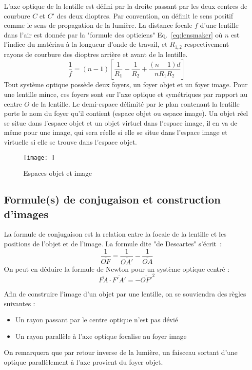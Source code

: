 \documentclass[a4paper]{book}
\begin{document}
L'axe optique de la lentille est défini par la droite passant par les deux centres de courbure $C$ et $C'$ des deux dioptres. Par convention, on définit le sens positif comme le sens de propagation de la lumière.  La distance focale $f$ d'une lentille dans l'air est donnée par la "formule des opticiens" Eq.~\ref{eq:lensmaker} où $n$ est l'indice du matériau à la longueur d'onde de travail, et $R_{1, 2}$ respectivement rayons de courbure des dioptres arrière et avant de la lentille. 
\begin{equation}
\label{eq:lensmaker}
\frac{1}{f}=(n-1)\left[\frac{1}{R_1}-\frac{1}{R_2}+\frac{(n-1)d}{n R_1 R_2}\right]
\end{equation}
Tout système optique possède deux foyers, un foyer objet et un foyer image. Pour une lentille mince, ces foyers sont sur l'axe optique et symétriques par rapport au centre $O$ de la lentille. Le demi-espace délimité par le plan contenant la lentille porte le nom du foyer qu'il contient (espace objet ou espace image). Un objet réel se situe dans l'espace objet et un objet virtuel dans l'espace image, il en va de même pour une image, qui sera réelle si elle se situe dans l'espace image et virtuelle si elle se trouve dans l'espace objet.
\begin{figure}[!htbp]
\begin{center}
\texttt{[image: ]}
\end{center}
\caption{Espaces objet et image}
\label{fig:espaces_lentille_mince}
\end{figure}

\subsection{Formule(s) de conjugaison et construction d'images}

La formule de conjugaison est la relation entre la focale de la lentille et les positions de l'objet et de l'image. La formule dite "de Descartes" s'écrit~:
\begin{equation}
\label{eq:descartes}
\frac{1}{\overline{OF}}=\frac{1}{\overline{OA'}}-\frac{1}{\overline{OA}}
\end{equation}
On peut en déduire la formule de Newton pour un système optique centré : 
\begin{equation}
\label{eq:newton}
\overline{FA}\cdot\overline{F'A'}=-\overline{OF'}^2
\end{equation}

Afin de construire l'image d'un objet par une lentille, on se souviendra des règles suivantes : 
\begin{itemize}
    \item Un rayon passant par le centre optique n'est pas dévié
    \item Un rayon parallèle à l'axe optique focalise au foyer image
\end{itemize}
On remarquera que par retour inverse de la lumière, un faisceau sortant d'une optique parallèlement à l'axe provient du foyer objet.
\end{document}

